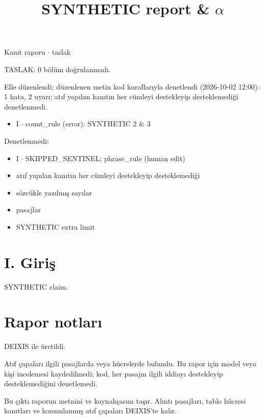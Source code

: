 \documentclass[journal]{IEEEtran}
\begin{document}
\renewcommand{\abstractname}{Özet}
\renewcommand{\IEEEkeywordsname}{Dizin Terimleri}
\renewcommand{\refname}{Kaynaklar}

\title{SYNTHETIC report \& \ensuremath{\alpha}}

\maketitle

\noindent Kanıt raporu \ensuremath{\cdot} taslak

\noindent TASLAK: 0 bölüm doğrulanmadı.

\noindent Elle düzenlendi; düzenlenen metin kod kurallarıyla denetlendi (2026-10-02 12:00): 1 hata, 2 uyarı; atıf yapılan kanıtın her cümleyi destekleyip desteklemediği denetlenmedi.

\begin{itemize}
\item I \ensuremath{\cdot} count\_rule (error): SYNTHETIC 2 \& 3
\end{itemize}

\noindent Denetlenmedi:

\begin{itemize}
\item I \ensuremath{\cdot} SKIPPED\_SENTINEL: phrase\_rule (human edit)
\item atıf yapılan kanıtın her cümleyi destekleyip desteklemediği
\item sözcükle yazılmış sayılar
\item pasajlar
\item SYNTHETIC extra limit
\end{itemize}

\section*{I. Giriş}

SYNTHETIC claim. \cite{Synth26}

\section*{Rapor notları}

DEIXIS ile üretildi.

Atıf çapaları ilgili pasajlarda veya hücrelerde bulundu. Bu rapor için model veya kişi incelemesi kaydedilmedi; kod, her pasajın ilgili iddiayı destekleyip desteklemediğini denetlemedi.

Bu çıktı raporun metnini ve kaynakçasını taşır. Alıntı pasajları, tablo hücresi kanıtları ve konumlanmış atıf çapaları DEIXIS'te kalır.




\end{document}
